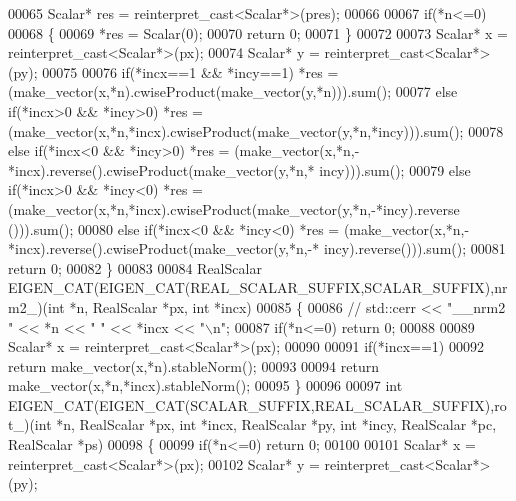 \begin{DoxyCode}
00065   Scalar* res = \textcolor{keyword}{reinterpret\_cast<}Scalar*\textcolor{keyword}{>}(pres);
00066 
00067   \textcolor{keywordflow}{if}(*n<=0)
00068   \{
00069     *res = Scalar(0);
00070     \textcolor{keywordflow}{return} 0;
00071   \}
00072 
00073   Scalar* x = \textcolor{keyword}{reinterpret\_cast<}Scalar*\textcolor{keyword}{>}(px);
00074   Scalar* y = \textcolor{keyword}{reinterpret\_cast<}Scalar*\textcolor{keyword}{>}(py);
00075 
00076   \textcolor{keywordflow}{if}(*incx==1 && *incy==1)    *res = (make\_vector(x,*n).cwiseProduct(make\_vector(y,*n))).sum();
00077   \textcolor{keywordflow}{else} \textcolor{keywordflow}{if}(*incx>0 && *incy>0) *res = (make\_vector(x,*n,*incx).cwiseProduct(make\_vector(y,*n,*incy))).sum();
00078   \textcolor{keywordflow}{else} \textcolor{keywordflow}{if}(*incx<0 && *incy>0) *res = (make\_vector(x,*n,-*incx).reverse().cwiseProduct(make\_vector(y,*n,*
      incy))).sum();
00079   \textcolor{keywordflow}{else} \textcolor{keywordflow}{if}(*incx>0 && *incy<0) *res = (make\_vector(x,*n,*incx).cwiseProduct(make\_vector(y,*n,-*incy).reverse
      ())).sum();
00080   \textcolor{keywordflow}{else} \textcolor{keywordflow}{if}(*incx<0 && *incy<0) *res = (make\_vector(x,*n,-*incx).reverse().cwiseProduct(make\_vector(y,*n,-*
      incy).reverse())).sum();
00081   \textcolor{keywordflow}{return} 0;
00082 \}
00083 
00084 RealScalar EIGEN\_CAT(EIGEN\_CAT(REAL\_SCALAR\_SUFFIX,SCALAR\_SUFFIX),nrm2\_)(\textcolor{keywordtype}{int} *n, RealScalar *px, \textcolor{keywordtype}{int} *incx)
00085 \{
00086 \textcolor{comment}{//   std::cerr << "\_\_nrm2 " << *n << " " << *incx << "\(\backslash\)n";}
00087   \textcolor{keywordflow}{if}(*n<=0) \textcolor{keywordflow}{return} 0;
00088 
00089   Scalar* x = \textcolor{keyword}{reinterpret\_cast<}Scalar*\textcolor{keyword}{>}(px);
00090 
00091   \textcolor{keywordflow}{if}(*incx==1)
00092     \textcolor{keywordflow}{return} make\_vector(x,*n).stableNorm();
00093 
00094   \textcolor{keywordflow}{return} make\_vector(x,*n,*incx).stableNorm();
00095 \}
00096 
00097 \textcolor{keywordtype}{int} EIGEN\_CAT(EIGEN\_CAT(SCALAR\_SUFFIX,REAL\_SCALAR\_SUFFIX),rot\_)(\textcolor{keywordtype}{int} *n, RealScalar *px, \textcolor{keywordtype}{int} *incx, 
      RealScalar *py, \textcolor{keywordtype}{int} *incy, RealScalar *pc, RealScalar *ps)
00098 \{
00099   \textcolor{keywordflow}{if}(*n<=0) \textcolor{keywordflow}{return} 0;
00100 
00101   Scalar* x = \textcolor{keyword}{reinterpret\_cast<}Scalar*\textcolor{keyword}{>}(px);
00102   Scalar* y = \textcolor{keyword}{reinterpret\_cast<}Scalar*\textcolor{keyword}{>}(py);

\end{DoxyCode}

